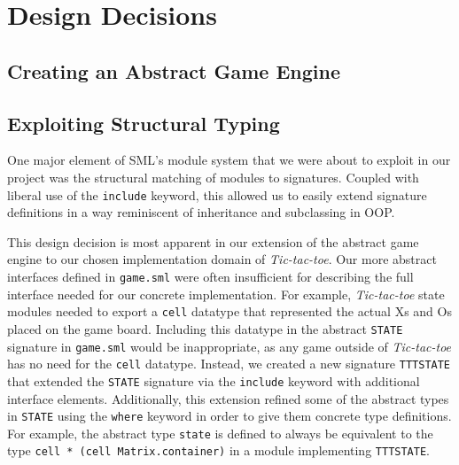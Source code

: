 \documentclass[9pt,letterpaper]{extarticle}
\begin{document}
	\section{Design Decisions}
  \subsection{Creating an Abstract Game Engine}
  \subsection{Exploiting Structural Typing}
  One major element of SML's module system that we were about to exploit in our project was
  the structural matching of modules to signatures. Coupled with liberal use of the \texttt{include}
  keyword, this allowed us to easily extend signature definitions in a way reminiscent of inheritance
  and subclassing in OOP.
  
  This design decision is most apparent in our extension of the abstract game engine to
  our chosen implementation domain of \textit{Tic-tac-toe}. Our more abstract interfaces defined
  in \texttt{game.sml} were often insufficient for describing the full interface
  needed for our concrete implementation. For example, \textit{Tic-tac-toe} state modules
  needed to export a \texttt{cell} datatype that represented the actual Xs and Os placed on the game
  board. Including this datatype in the abstract \texttt{STATE} signature in \texttt{game.sml}
  would be inappropriate, as any game outside of \textit{Tic-tac-toe} has no need for the
  \texttt{cell} datatype. Instead, we created a new signature \texttt{TTTSTATE} that extended
  the \texttt{STATE} signature via the \texttt{include} keyword with additional interface elements.
  Additionally, this extension refined
  some of the abstract types in \texttt{STATE} using the \texttt{where} keyword in order to give them
  concrete type definitions. For example, the abstract type \texttt{state} is defined to always be
  equivalent to the type \texttt{cell * (cell Matrix.container)} in a module implementing \texttt{TTTSTATE}.
  
\end{document}
